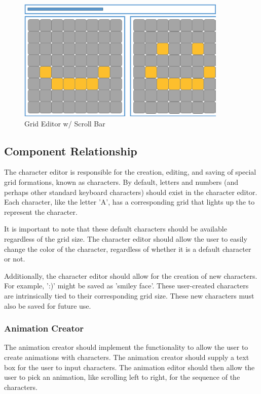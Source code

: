 \documentclass[12pt]{article}
\begin{document}
	\begin{figure}[ht!]
		\centering
		\includegraphics[width=100mm]{Multi-grid.png}
		\caption{Grid Editor w/ Scroll Bar}
	\end{figure}
	\clearpage
	
	
	\subsection {Component Relationship}
	The character editor is responsible for the creation, editing, and saving of special grid formations, known as characters. By default, letters and numbers (and perhaps other standard keyboard characters) should exist in the character editor. Each character, like the letter 'A', has a corresponding grid that lights up the to represent the character.
	
	It is important to note that these default characters should be available regardless of the grid size. The character editor should allow the user to easily change the color of the character, regardless of whether it is a default character or not.
	
	Additionally, the character editor should allow for the creation of new characters. For example, ':)' might be saved as 'smiley face'. These user-created characters are intrinsically tied to their corresponding grid size. These new characters must also be saved for future use.
	

	
	\subsubsection{Animation Creator}
	The animation creator should implement the functionality to allow the user to create animations with characters. The animation creator should supply a text box for the user to input characters. The animation editor should then allow the user to pick an animation, like scrolling left to right, for the sequence of the characters.
	
\end{document}
